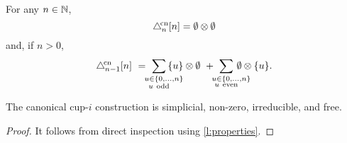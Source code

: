 \begin{example*}
	For any $n \in \mathbb{N}$,
	\[
	\triangle^{\!\mathrm{cn}}_n[n] = \emptyset \otimes \emptyset
	\]
	and, if $n > 0$,
	\[
	\canonical_{n-1} [n] \ = \
	\sum_{\mathclap{\substack{\quad u \in \{0,\dots,n\} \\ u \ \mathrm{odd}}}} \,\{u\} \ot \emptyset \ + \
	\sum_{\mathclap{\substack{\quad u \in \{0,\dots,n\} \\ u \ \mathrm{even}}}} \,\emptyset \ot \{u\}.
	\]
\end{example*}

\begin{theorem}\label{t:existence}
	The canonical \mbox{cup-$i$} construction is simplicial, non-zero, irreducible, and free.
\end{theorem}

\begin{proof}
	It follows from direct inspection using \cref{l:properties}.
\end{proof}